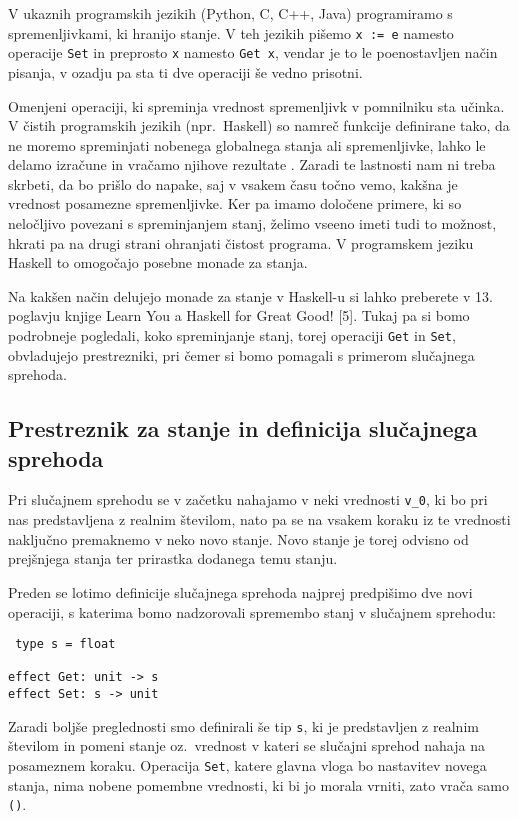 \documentclass[a4paper,12pt]{article}
\theoremstyle{definition} %
\begin{document}
V ukaznih programskih jezikih (Python, C, C++, Java) programiramo s spremenljivkami, ki hranijo stanje. V teh jezikih pišemo \lstinline{x := e} namesto operacije \lstinline{Set} in preprosto \lstinline{x} namesto \lstinline{Get x}, vendar je to le poenostavljen način pisanja, v ozadju pa sta ti dve operaciji še vedno prisotni. 

Omenjeni operaciji, ki spreminja vrednost spremenljivk v pomnilniku sta učinka. V čistih programskih jezikih (npr.\ Haskell) so namreč funkcije definirane tako, da ne moremo spreminjati nobenega globalnega stanja ali spremenljivke, lahko le delamo izračune in vračamo njihove rezultate \cite{haskell}. Zaradi te lastnosti nam ni treba skrbeti, da bo prišlo do napake, saj v vsakem času točno vemo, kakšna je vrednost posamezne spremenljivke. Ker pa imamo določene primere, ki so neločljivo povezani s spreminjanjem stanj, želimo vseeno imeti tudi to možnost, hkrati pa na drugi strani ohranjati čistost programa. V programskem jeziku Haskell to omogočajo posebne monade za stanja. 

Na kakšen način delujejo monade za stanje v Haskell-u si lahko preberete v 13. poglavju knjige Learn You a Haskell for Great Good! [5]. Tukaj pa si bomo
podrobneje pogledali, koko spreminjanje stanj, torej operaciji \lstinline{Get} in \lstinline{Set}, obvladujejo prestrezniki, pri čemer si
bomo pomagali s primerom slučajnega sprehoda.

\subsection{Prestreznik za stanje in definicija slučajnega sprehoda}

Pri slučajnem sprehodu se v začetku nahajamo v neki vrednosti \lstinline{v_0}, ki bo pri nas predstavljena z realnim številom, nato pa se na vsakem koraku iz te vrednosti naključno premaknemo v neko novo stanje. Novo stanje je torej odvisno od prejšnjega stanja ter prirastka dodanega temu stanju. 

Preden se lotimo definicije slučajnega sprehoda najprej predpišimo dve novi operaciji, s katerima bomo nadzorovali spremembo stanj v slučajnem sprehodu:
 \begin{lstlisting}
 type s = float
 
effect Get: unit -> s
effect Set: s -> unit
\end{lstlisting}
Zaradi boljše preglednosti smo definirali še tip \lstinline{s}, ki je predstavljen z realnim številom in pomeni stanje oz.\ vrednost v kateri se slučajni sprehod nahaja na posameznem koraku. Operacija \lstinline{Set}, katere glavna vloga bo nastavitev novega stanja, nima nobene pomembne vrednosti, ki bi jo morala vrniti, zato vrača samo \lstinline{()}. 
\end{document}
